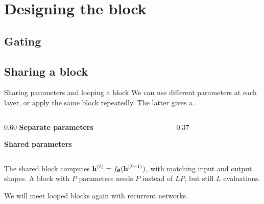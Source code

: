 \section{Designing the block}

\subsection{Gating}




\subsection{Sharing a block}

\begin{frame}{Sharing parameters and looping a block}
	\small
	\setlength{\abovedisplayskip}{4pt}\setlength{\belowdisplayskip}{4pt}
	We can use different parameters at each layer, or apply the same block
	repeatedly. The latter gives a .

	\smallskip
	\begin{columns}[c,onlytextwidth]
		\begin{column}{0.60\textwidth}
			\textbf{\color{darkcerulean}Separate parameters}\par\smallskip
			\centering\par\smallskip
			\raggedright\textbf{\color{darkcerulean}Shared parameters}\par\smallskip
			\centering
		\end{column}
		\begin{column}{0.37\textwidth}
			\centering
			
		\end{column}
	\end{columns}

	\medskip
	\begin{tcolorbox}[nndsgreen,boxsep=1mm,top=1mm,bottom=1mm,fontupper=\small]
		The shared block computes $\boldsymbol{\mathbf{h}}^{(\ell)}=f_{\boldsymbol{\theta}}(\boldsymbol{\mathbf{h}}^{(\ell-1)})$, with matching input and output shapes. A block with $P$ parameters needs $P$ instead of $LP$, but still $L$ evaluations.
	\end{tcolorbox}

	We will meet looped blocks again with recurrent networks.
\end{frame}


